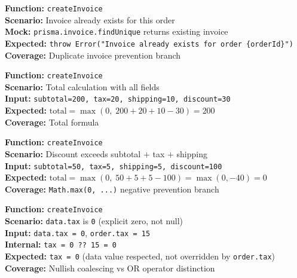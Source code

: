 \documentclass[12pt,a4paper]{report}
\newcommand{\pone}{\textbf{\color{p1red}P1}}
\newcommand{\ptwo}{\textbf{\color{p2orange}P2}}
\begin{document}
\begin{tcolorbox}[criticalbox, title={INV-005 \hfill \pone\ --- Duplicate Invoice}]
\textbf{Function:} \texttt{createInvoice} \\
\textbf{Scenario:} Invoice already exists for this order \\
\textbf{Mock:} \texttt{prisma.invoice.findUnique} returns existing invoice \\
\textbf{Expected:} \texttt{throw Error("Invoice already exists for order \{orderId\}")} \\
\textbf{Coverage:} Duplicate invoice prevention branch
\end{tcolorbox}

\begin{tcolorbox}[testbox, title={INV-006 \hfill \pone}]
\textbf{Function:} \texttt{createInvoice} \\
\textbf{Scenario:} Total calculation with all fields \\
\textbf{Input:} \texttt{subtotal=200, tax=20, shipping=10, discount=30} \\
\textbf{Expected:} $\text{total} = \max(0,\; 200 + 20 + 10 - 30) = 200$ \\
\textbf{Coverage:} Total formula
\end{tcolorbox}

\begin{tcolorbox}[criticalbox, title={INV-007 \hfill \pone\ --- Negative Total Prevention}]
\textbf{Function:} \texttt{createInvoice} \\
\textbf{Scenario:} Discount exceeds subtotal + tax + shipping \\
\textbf{Input:} \texttt{subtotal=50, tax=5, shipping=5, discount=100} \\
\textbf{Expected:} $\text{total} = \max(0,\; 50 + 5 + 5 - 100) = \max(0, -40) = 0$ \\
\textbf{Coverage:} \texttt{Math.max(0, ...)} negative prevention branch
\end{tcolorbox}

\begin{tcolorbox}[testbox, title={INV-008 \hfill \ptwo}]
\textbf{Function:} \texttt{createInvoice} \\
\textbf{Scenario:} \texttt{data.tax} is \texttt{0} (explicit zero, not null) \\
\textbf{Input:} \texttt{data.tax = 0}, \texttt{order.tax = 15} \\
\textbf{Internal:} \texttt{tax = 0 ?? 15 = 0} \\
\textbf{Expected:} \texttt{tax = 0} (data value respected, not overridden by \texttt{order.tax}) \\
\textbf{Coverage:} Nullish coalescing vs OR operator distinction
\end{tcolorbox}
\end{document}
